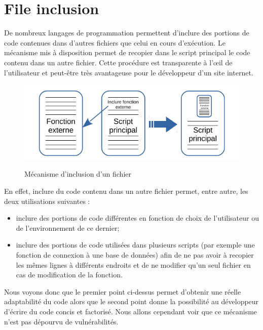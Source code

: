 
\newpage

\section{File inclusion}

De nombreux langages de programmation permettent d'inclure des portions de code contenues dans d'autres fichiers que celui en cours d'exécution. Le mécanisme mis à disposition permet de recopier dans le script principal le code contenu dans un autre fichier. Cette procédure est transparente à l'œil de l'utilisateur et peut-être très avantageuse pour le développeur d'un site internet.

\begin{figure}[!h]
\begin{center}

\label{inclusion}
\includegraphics[scale=1.2]{images/include.pdf}

\caption{Mécanisme d'inclusion d'un fichier}

\end{center}
\end{figure}

En effet, inclure du code contenu dans un autre fichier permet, entre autre, les deux utilisations suivantes :
\begin{itemize}
\item inclure des portions de code différentes en fonction de choix de l'utilisateur ou de l'environnement de ce dernier;
\item inclure des portions de code utilisées dans plusieurs scripts (par exemple une fonction de connexion à une base de données) afin de ne pas avoir à recopier les mêmes lignes à différents endroits et de ne modifier qu'un seul fichier en cas de modification de la fonction.
\end{itemize}

Nous voyons donc que le premier point ci-dessus permet d'obtenir une réelle adaptabilité du code alors que le second point donne la possibilité au développeur d'écrire du code concis et factorisé. Nous allons cependant voir que ce mécanisme n'est pas dépourvu de vulnérabilités.


